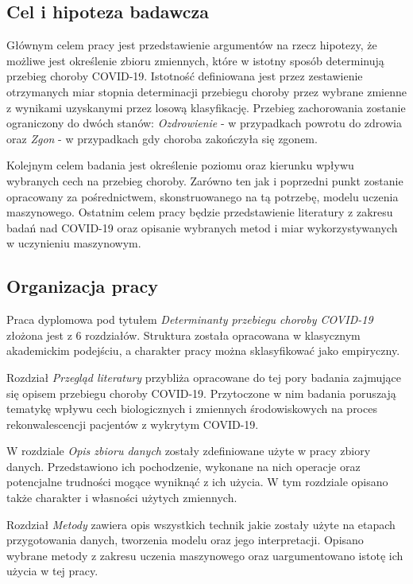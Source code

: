 \documentclass[polish, twoside, 12pt, a4paper]{article}
\theoremstyle{definition}
\theoremstyle{plain}
\theoremstyle{remark}
\begin{document}
\subsection{Cel i hipoteza badawcza}

Głównym celem pracy jest przedstawienie argumentów na rzecz hipotezy, że możliwe jest określenie zbioru zmiennych, które w istotny sposób determinują przebieg choroby COVID-19. Istotność definiowana jest przez zestawienie otrzymanych miar stopnia determinacji przebiegu choroby przez wybrane zmienne z wynikami uzyskanymi przez losową klasyfikację. Przebieg zachorowania zostanie ograniczony do dwóch stanów: \emph{Ozdrowienie} - w przypadkach powrotu do zdrowia oraz \emph{Zgon} - w przypadkach gdy choroba zakończyła się zgonem.

Kolejnym celem badania jest określenie poziomu oraz kierunku wpływu wybranych cech na przebieg choroby. Zarówno ten jak i poprzedni punkt zostanie opracowany za pośrednictwem, skonstruowanego na tą potrzebę, modelu uczenia maszynowego. Ostatnim celem pracy będzie przedstawienie literatury z zakresu badań nad COVID-19 oraz opisanie wybranych metod i miar wykorzystywanych w uczynieniu maszynowym. 

\subsection{Organizacja pracy}

Praca dyplomowa pod tytułem \emph{Determinanty przebiegu choroby COVID-19} złożona jest z 6 rozdziałów. Struktura została opracowana w klasycznym akademickim podejściu, a charakter pracy można sklasyfikować jako empiryczny.

Rozdział \emph{Przegląd literatury} przybliża opracowane do tej pory badania zajmujące się opisem przebiegu choroby COVID-19. Przytoczone w nim badania poruszają tematykę wpływu cech biologicznych i zmiennych środowiskowych na proces rekonwalescencji pacjentów z wykrytym COVID-19.

W rozdziale \emph{Opis zbioru danych} zostały zdefiniowane użyte w pracy zbiory danych. Przedstawiono ich pochodzenie, wykonane na nich operacje oraz potencjalne trudności mogące wyniknąć z ich użycia. W tym rozdziale opisano także charakter i własności użytych zmiennych.

Rozdział \emph{Metody} zawiera opis wszystkich technik jakie zostały użyte na etapach przygotowania danych, tworzenia modelu oraz jego interpretacji. Opisano wybrane metody z zakresu uczenia maszynowego oraz uargumentowano istotę ich użycia w tej pracy.
\end{document}
